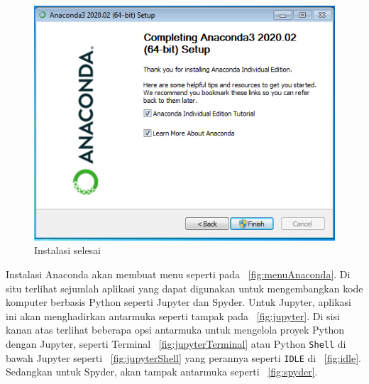 \begin{figure}
  \begin{center}
    \includegraphics[scale=.5]{pics/anacondaInstall9.png}
    \caption{Instalasi selesai}
    \label{fig:instalasiEnd}
  \end{center}
\end{figure}

Instalasi Anaconda akan membuat menu seperti pada \figurename~\ref{fig:menuAnaconda}. Di situ terlihat sejumlah aplikasi yang dapat digunakan untuk mengembangkan kode komputer berbasis Python seperti Jupyter dan Spyder. Untuk Jupyter, aplikasi ini akan menghadirkan antarmuka seperti tampak pada \figurename~\ref{fig:jupyter}. Di sisi kanan atas terlihat beberapa opsi antarmuka untuk mengelola proyek Python dengan Jupyter, seperti Terminal \figurename~\ref{fig:jupyterTerminal} atau Python \texttt{Shell} di bawah Jupyter seperti \figurename~\ref{fig:jupyterShell} yang perannya seperti \texttt{IDLE} di \figurename~\ref{fig:idle}. Sedangkan untuk Spyder, akan tampak antarmuka seperti \figurename~\ref{fig:spyder}.

